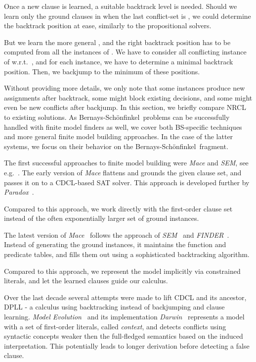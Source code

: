 \documentclass[a4paper]{article}
\newcommand{\mEPR}{Bernays-Sch\"onfinkel}
\newcommand{\mEPRs}{BS}
\begin{document}
{Once a new clause is learned, a suitable backtrack level is needed. 
Should we learn only the ground clauses in  when the last conflict-set  is , 
we could determine the backtrack position at ease, similarly to the propositional solvers. 

But we learn the more general , and the right backtrack position has to be computed from all the 
instances of .
We have to consider all conflicting instance of  w.r.t.\ , and for each instance, we have to determine a minimal backtrack position.
Then, we backjump to the minimum of these positions. 

Without providing more details, we only note that some instances produce new assignments after backtrack, some might block existing decisions, and some might even
be new conflicts after backjump. %
In this section, we briefly compare NRCL to existing solutions.
As \mEPR~problems can be successfully handled with finite model finders as well, 
we cover both \mEPRs-specific techniques and more general finite model building approaches.
In the case of the latter systems, we focus on their behavior on the \mEPR~fragment.

The first successful approaches to finite model building were \emph{Mace} and \emph{SEM}, see e.g.\ \cite{Tammet03finitemodel}.
The early version of \emph{Mace} flattens and grounds the given clause set, and passes it on to a CDCL-based SAT solver. 
This approach is developed further by \emph{Paradox}~\cite{ParadoxRef}. 

Compared to this approach, we work directly with the first-order clause set instead of the often exponentially larger set of ground instances.

The latest version of \emph{Mace}~\cite{Mace4Ref03} follows the approach of \emph{SEM}~\cite{SEMRef95} and \emph{FINDER}~\cite{FinderRef94}. 
Instead of generating the ground instances, 
it maintains the function and predicate tables, and fills them out using a sophisticated backtracking algorithm. 

Compared to this approach, we represent the model implicitly via constrained literals,  
and let the learned clauses guide our calculus.

Over the last decade several attempts were made to lift CDCL and its ancestor, DPLL - 
a calculus using backtracking instead of backjumping and clause learning. 
\emph{Model Evolution}~\cite{ModelEvolution03} and its implementation \emph{Darwin}~\cite{Darwin04}
represents a model with a set of first-order literals, called \emph{context}, and 
detects conflicts using syntactic concepts weaker then the full-fledged semantics based on
the induced interpretation.
This potentially leads to longer derivation before detecting a false clause.

}
\end{document}

